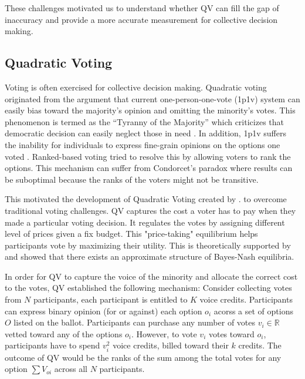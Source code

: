 These challenges motivated us 
to understand whether QV can fill the gap of inaccuracy
and provide a more accurate measurement
for collective decision making.\par

\subsection{Quadratic Voting}
Voting is often exercised
for collective decision making.
Quadratic voting originated 
from the argument
that current one-person-one-vote (1p1v) system
can easily bias toward the majority's opinion
and omitting the minority's votes.
This phenomenon is termed as 
the ``Tyranny of the Majority''
which criticizes that democratic decision
can easily neglect those in need 
\cite{posner2018radical}.
In addition, 1p1v suffers the inability
for individuals to express fine-grain opinions
on the options one voted \cite{sep-voting-methods}.
Ranked-based voting tried to resolve this
by allowing voters to rank the options.
This mechanism can
suffer from Condorcet's paradox 
where results can be suboptimal 
because the ranks of the voters
might not be transitive\cite{easley2012networks, sep-voting-methods}.

This motivated the development of Quadratic Voting
created by \textcite{posner2018radical}. 
to overcome traditional voting challenges.
QV captures the cost a voter has to pay
when they made a particular voting decision.
It regulates the votes by assigning different level of prices
given a fix budget.
This "price-taking" equilibrium helps
participants vote by maximizing their utility.
This is theoretically supported by \textcite{lalley2018quadratic}
and showed that there exists an approximate structure of Bayes-Nash equilibria.

In order for QV to capture the voice of the minority
and allocate the correct cost to the votes,
QV established the following mechanism:
Consider collecting votes from $N$ participants,
each participant is entitled to 
$K$ voice credits.
Participants can express binary opinion (for or against)
each option $o_i$ acorss a set of options $O$ listed on the ballot. 
Participants can purchase any number of votes $v_i \in \mathbb{R}$
vetted toward any of the options $o_i$.
However, to vote $v_i$ votes toward $o_i$,
participants have to spend $v_i^2$ voice credits,
billed toward their $k$ credits.
The outcome of QV 
would be the ranks of the sum
among the total votes for any option $\sum{V_{oi}}$
across all $N$ participants.

